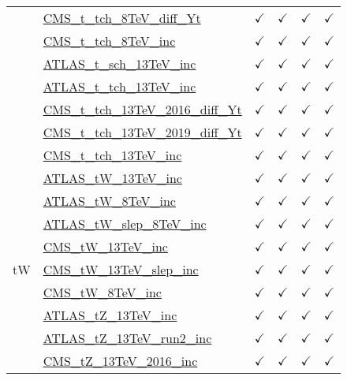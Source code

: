 \documentclass{article}
\begin{document}
\begin{longtable}{|c|l|c|c|c|c|}
 & \href{https://arxiv.org}{CMS_t_tch_8TeV_diff_Yt}  & $\checkmark$ & $\checkmark$ & $\checkmark$ & $\checkmark$\\ \cline{2-6}
 & \href{https://arxiv.org}{CMS_t_tch_8TeV_inc}  & $\checkmark$ & $\checkmark$ & $\checkmark$ & $\checkmark$\\ \cline{2-6}
 & \href{https://arxiv.org}{ATLAS_t_sch_13TeV_inc}  & $\checkmark$ & $\checkmark$ & $\checkmark$ & $\checkmark$\\ \cline{2-6}
 & \href{https://arxiv.org}{ATLAS_t_tch_13TeV_inc}  & $\checkmark$ & $\checkmark$ & $\checkmark$ & $\checkmark$\\ \cline{2-6}
 & \href{https://arxiv.org}{CMS_t_tch_13TeV_2016_diff_Yt}  & $\checkmark$ & $\checkmark$ & $\checkmark$ & $\checkmark$\\ \cline{2-6}
 & \href{https://arxiv.org}{CMS_t_tch_13TeV_2019_diff_Yt}  & $\checkmark$ & $\checkmark$ & $\checkmark$ & $\checkmark$\\ \cline{2-6}
 & \href{https://arxiv.org}{CMS_t_tch_13TeV_inc}  & $\checkmark$ & $\checkmark$ & $\checkmark$ & $\checkmark$
\\ \hline
\multirow{11}{*}{tW}
 & \href{https://arxiv.org}{ATLAS_tW_13TeV_inc}  & $\checkmark$ & $\checkmark$ & $\checkmark$ & $\checkmark$\\ \cline{2-6}
 & \href{https://arxiv.org}{ATLAS_tW_8TeV_inc}  & $\checkmark$ & $\checkmark$ & $\checkmark$ & $\checkmark$\\ \cline{2-6}
 & \href{https://arxiv.org}{ATLAS_tW_slep_8TeV_inc}  & $\checkmark$ & $\checkmark$ & $\checkmark$ & $\checkmark$\\ \cline{2-6}
 & \href{https://arxiv.org}{CMS_tW_13TeV_inc}  & $\checkmark$ & $\checkmark$ & $\checkmark$ & $\checkmark$\\ \cline{2-6}
 & \href{https://arxiv.org}{CMS_tW_13TeV_slep_inc}  & $\checkmark$ & $\checkmark$ & $\checkmark$ & $\checkmark$\\ \cline{2-6}
 & \href{https://arxiv.org}{CMS_tW_8TeV_inc}  & $\checkmark$ & $\checkmark$ & $\checkmark$ & $\checkmark$\\ \cline{2-6}
 & \href{https://arxiv.org}{ATLAS_tZ_13TeV_inc}  & $\checkmark$ & $\checkmark$ & $\checkmark$ & $\checkmark$\\ \cline{2-6}
 & \href{https://arxiv.org}{ATLAS_tZ_13TeV_run2_inc}  & $\checkmark$ & $\checkmark$ & $\checkmark$ & $\checkmark$\\ \cline{2-6}
 & \href{https://arxiv.org}{CMS_tZ_13TeV_2016_inc}  & $\checkmark$ & $\checkmark$ & $\checkmark$ & $\checkmark$\\ \cline{2-6}

\end{longtable}
\end{document}

